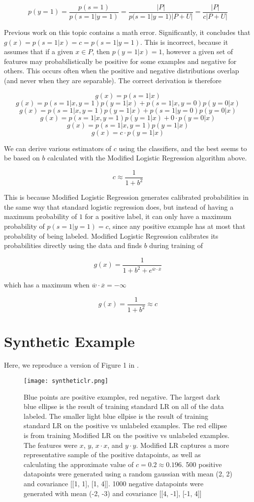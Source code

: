 \documentclass[]{article}
\begin{document}
$$ p(y=1) = \frac{p(s=1)}{p(s = 1|y = 1)} =  \frac{|P|}{p(s = 1|y = 1)|P+U|} = \frac{|P|}{c|P+U|} $$

Previous work on this topic\cite{elkan08} contains a math error.  Significantly, it concludes that $g(x) = p(s=1|x) = c = p(s=1|y=1)$. This is incorrect, because it assumes that if a given $x \in P$, then $p(y=1|x) = 1$, however a given set of features may probabilistically be positive for some examples and negative for others. This occurs often when the positive and negative distributions overlap (and never when they are separable). The correct derivation is therefore

$$ g(x) = p(s=1|x) $$
$$ g(x) = p(s=1|x,y=1)p(y=1|x) + p(s=1|x,y=0)p(y=0|x)$$
$$ g(x) = p(s=1|x,y=1)p(y=1|x) + p(s=1|y=0)p(y=0|x)$$
$$ g(x) = p(s=1|x,y=1)p(y=1|x) + 0 \cdot p(y=0|x)$$
$$ g(x) = p(s=1|x,y=1)p(y=1|x)$$
$$ g(x) = c \cdot p(y=1|x)$$

We can derive various estimators of $c$ using the classifiers, and the best seems to be based on $b$ calculated with the Modified Logistic Regression algorithm above.

$$c \approx \frac{1}{1 + b^2}$$

This is because Modified Logistic Regression generates calibrated probabilities in the same way that standard logistic regression does, but instead of having a maximum probability of $1$ for a positive label, it can only have a maximum probability of $p(s=1|y=1)=c$, since any positive example has at most that probability of being labeled.  Modified Logistic Regression calibrates its probabilities directly using the data and finds $b$ during training of

$$g(x) = \frac{1}{1 + b^2 + e^{\overline{w} \cdot \overline{x}}}$$

which has a maximum when $\overline{w} \cdot \overline{x}=-\infty$

$$g(x) = \frac{1}{1 + b^2} \approx c$$


\section{Synthetic Example}

Here, we reproduce a version of Figure 1 in \cite{elkan08}. 

\label{Synthetic data}
\begin{figure}[ht!]
\centering
\texttt{[image: syntheticlr.png]}
\caption{Blue points are positive examples, red negative. The largest dark blue ellipse is the result of training standard LR on all of the data labeled. The smaller light blue ellpise is the result of training standard LR on the positive vs unlabeled examples. The red ellipse is from training Modified LR on the positive vs unlabeled examples. The features were $x$, $y$, $x \cdot x$, and $y \cdot y$.  Modified LR captures a more representative sample of the positive datapoints, as well as calculating the approximate value of $c = 0.2 \approx 0.196$.   500 positive datapoints were generated using a random gaussian with mean (2, 2) and covariance [[1, 1], [1, 4]].  1000 negative datapoints were generated with mean (-2, -3) and covariance [[4, -1], [-1, 4]]}
\end{figure}



\end{document}
